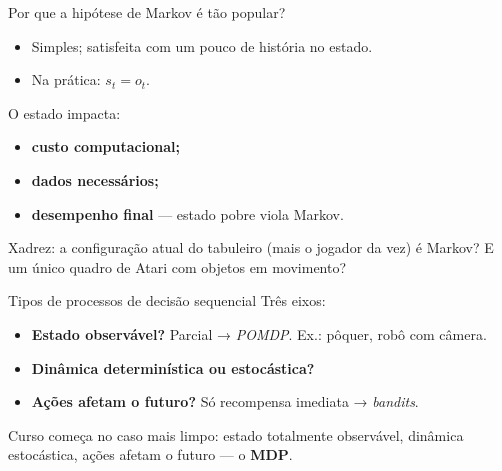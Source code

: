 \documentclass[aspectratio=169, 11pt]{beamer}
\newcommand{\paradiscussao}{\smallskip
  {\footnotesize\color{rlCinza}\itshape }}
\begin{document}
\begin{frame}{Por que a hipótese de Markov é tão popular?}
  \begin{itemize}
    \item Simples; satisfeita com um pouco de história no estado.
    \item Na prática: $s_t = o_t$.
  \end{itemize}

  \medskip
  O estado impacta:
  \begin{itemize}
    \item \textbf{custo computacional;}
    \item \textbf{dados necessários;}
    \item \textbf{desempenho final} — estado pobre viola Markov.
  \end{itemize}

  \begin{quizbox}{}
    Xadrez: a configuração atual do tabuleiro (mais o jogador da vez) é Markov? E um único quadro de Atari com objetos em movimento?
  \end{quizbox}
  \paradiscussao
\end{frame}

\begin{frame}{Tipos de processos de decisão sequencial}
  Três eixos:
  \begin{itemize}
    \item \textbf{Estado observável?} Parcial → \emph{POMDP}. Ex.: pôquer, robô com câmera.
    \item \textbf{Dinâmica determinística ou estocástica?}
    \item \textbf{Ações afetam o futuro?} Só recompensa imediata → \emph{bandits}.
  \end{itemize}

  \medskip
  {\small\color{rlCinza} Curso começa no caso mais limpo: estado totalmente observável, dinâmica estocástica, ações afetam o futuro — o \textbf{MDP}.}
\end{frame}
\end{document}
